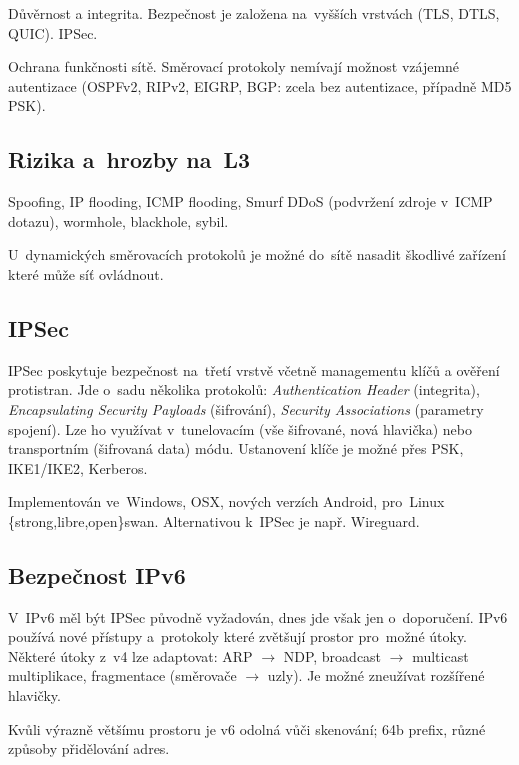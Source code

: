 Důvěrnost a integrita.
Bezpečnost je založena na~vyšších vrstvách (TLS, DTLS, QUIC).
IPSec.

Ochrana funkčnosti sítě.
Směrovací protokoly nemívají možnost vzájemné autentizace (OSPFv2, RIPv2, EIGRP, BGP: zcela bez autentizace, případně MD5 PSK).


\subsection{Rizika a~hrozby na~L3}

Spoofing, IP flooding, ICMP flooding, Smurf DDoS (podvržení zdroje v~ICMP dotazu), wormhole, blackhole, sybil.

U~dynamických směrovacích protokolů je možné do~sítě nasadit škodlivé zařízení které může síť ovládnout.


\subsection{IPSec}

IPSec poskytuje bezpečnost na~třetí vrstvě včetně managementu klíčů a ověření protistran.
Jde o~sadu několika protokolů: \emph{Authentication Header} (integrita), \emph{Encapsulating Security Payloads} (šifrování), \emph{Security Associations} (parametry spojení).
Lze ho využívat v~tunelovacím (vše šifrované, nová hlavička) nebo transportním (šifrovaná data) módu.
Ustanovení klíče je možné přes PSK, IKE1/IKE2, Kerberos.

Implementován ve~Windows, OSX, nových verzích Android, pro~Linux \{strong,libre,open\}swan.
Alternativou k~IPSec je např. Wireguard.


\subsection{Bezpečnost IPv6}

V~IPv6 měl být IPSec původně vyžadován, dnes jde však jen o~doporučení.
IPv6 používá nové přístupy a~protokoly které zvětšují prostor pro~možné útoky.
Některé útoky z~v4 lze adaptovat: ARP $\rightarrow$ NDP, broadcast $\rightarrow$ multicast multiplikace, fragmentace (směrovače $\rightarrow$ uzly).
Je možné zneužívat rozšířené hlavičky.

Kvůli výrazně většímu prostoru je v6 odolná vůči skenování; 64b prefix, různé způsoby přidělování adres.




\clearpage
